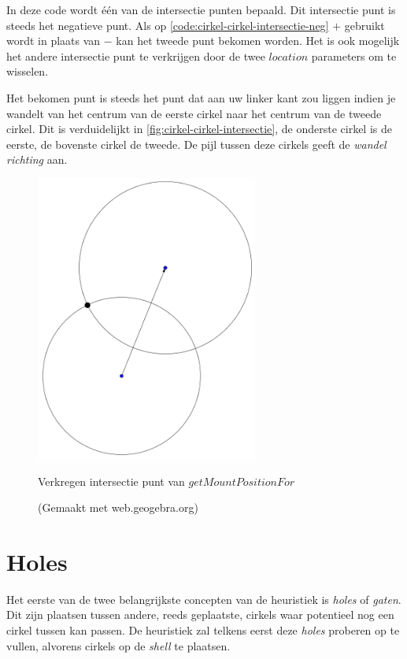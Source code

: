 \documentclass[12pt,a4paper,oneside]{book}
\begin{document}
In deze code wordt één van de intersectie punten bepaald.
Dit intersectie punt is steeds het negatieve punt.
Als op \autoref{code:cirkel-cirkel-intersectie-neg} $+$ gebruikt wordt in plaats van $-$ kan het tweede punt bekomen worden.
Het is ook mogelijk het andere intersectie punt te verkrijgen door de twee $location$ parameters om te wisselen.

Het bekomen punt is steeds het punt dat aan uw linker kant zou liggen indien je wandelt van het centrum van de eerste cirkel naar het centrum van de tweede cirkel.
Dit is verduidelijkt in \autoref{fig:cirkel-cirkel-intersectie}, de onderste cirkel is de eerste, de bovenste cirkel de tweede.
De pijl tussen deze cirkels geeft de \textit{wandel richting} aan.

\begin{figure}
  \centering
  \includegraphics[width=0.65\textwidth]{cirkel-cirkel-intersectie.png}
  \caption{Verkregen intersectie punt van $getMountPositionFor$} \label{fig:cirkel-cirkel-intersectie} 
  \caption*{(Gemaakt met web.geogebra.org)}
\end{figure}

\section{Holes} \label{sec:holes}

Het eerste van de twee belangrijkste concepten van de heuristiek is \textit{holes} of \textit{gaten}.
Dit zijn plaatsen tussen andere, reeds geplaatste, cirkels waar potentieel nog een cirkel tussen kan passen.
De heuristiek zal telkens eerst deze \textit{holes} proberen op te vullen, alvorens cirkels op de \textit{shell} te plaatsen.
\end{document}

